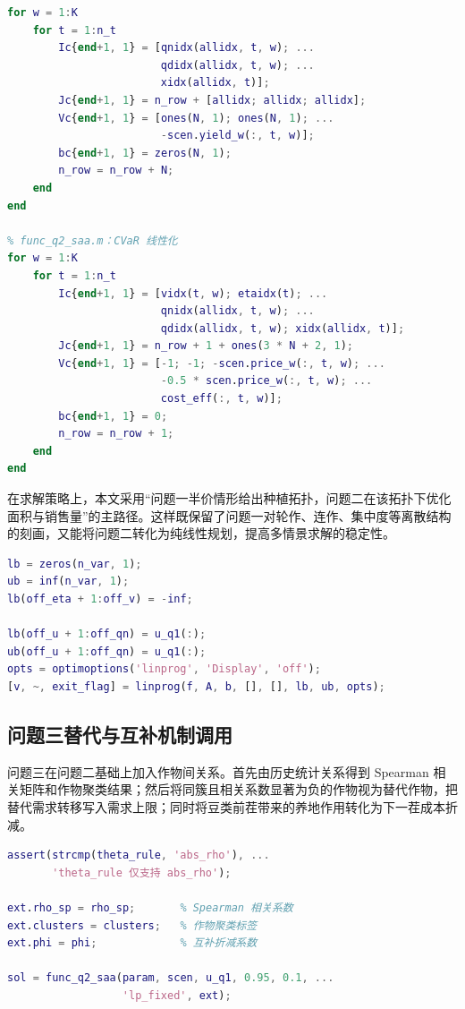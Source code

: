 \begin{lstlisting}[style=matlabstyle,language=Matlab]
% func_q2_saa.m：情景产销约束
for w = 1:K
    for t = 1:n_t
        Ic{end+1, 1} = [qnidx(allidx, t, w); ...
                        qdidx(allidx, t, w); ...
                        xidx(allidx, t)];
        Jc{end+1, 1} = n_row + [allidx; allidx; allidx];
        Vc{end+1, 1} = [ones(N, 1); ones(N, 1); ...
                        -scen.yield_w(:, t, w)];
        bc{end+1, 1} = zeros(N, 1);
        n_row = n_row + N;
    end
end

% func_q2_saa.m：CVaR 线性化
for w = 1:K
    for t = 1:n_t
        Ic{end+1, 1} = [vidx(t, w); etaidx(t); ...
                        qnidx(allidx, t, w); ...
                        qdidx(allidx, t, w); xidx(allidx, t)];
        Jc{end+1, 1} = n_row + 1 + ones(3 * N + 2, 1);
        Vc{end+1, 1} = [-1; -1; -scen.price_w(:, t, w); ...
                        -0.5 * scen.price_w(:, t, w); ...
                        cost_eff(:, t, w)];
        bc{end+1, 1} = 0;
        n_row = n_row + 1;
    end
end
\end{lstlisting}

在求解策略上，本文采用“问题一半价情形给出种植拓扑，问题二在该拓扑下优化面积与销售量”的主路径。这样既保留了问题一对轮作、连作、集中度等离散结构的刻画，又能将问题二转化为纯线性规划，提高多情景求解的稳定性。

\begin{lstlisting}[style=matlabstyle,language=Matlab]
% func_q2_saa.m：拓扑固定后的线性规划求解
lb = zeros(n_var, 1);
ub = inf(n_var, 1);
lb(off_eta + 1:off_v) = -inf;

lb(off_u + 1:off_qn) = u_q1(:);
ub(off_u + 1:off_qn) = u_q1(:);
opts = optimoptions('linprog', 'Display', 'off');
[v, ~, exit_flag] = linprog(f, A, b, [], [], lb, ub, opts);
\end{lstlisting}

\subsection{问题三替代与互补机制调用}

问题三在问题二基础上加入作物间关系。首先由历史统计关系得到 Spearman 相关矩阵和作物聚类结果；然后将同簇且相关系数显著为负的作物视为替代作物，把替代需求转移写入需求上限；同时将豆类前茬带来的养地作用转化为下一茬成本折减。

\begin{lstlisting}[style=matlabstyle,language=Matlab]
% func_q3_extend.m：将统计关系传入随机规划模型
assert(strcmp(theta_rule, 'abs_rho'), ...
       'theta_rule 仅支持 abs_rho');

ext.rho_sp = rho_sp;       % Spearman 相关系数
ext.clusters = clusters;   % 作物聚类标签
ext.phi = phi;             % 互补折减系数

sol = func_q2_saa(param, scen, u_q1, 0.95, 0.1, ...
                  'lp_fixed', ext);
\end{lstlisting}

